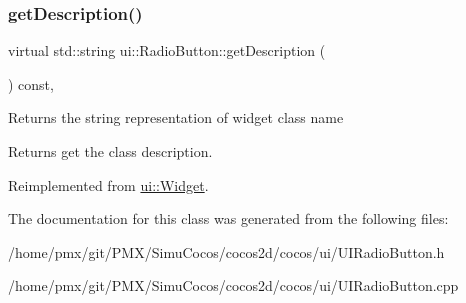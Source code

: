 \subsubsection{\texorpdfstring{get\+Description()}{getDescription()}\hspace{0.1cm}{\footnotesize\ttfamily [2/2]}}
{\footnotesize\ttfamily virtual std\+::string ui\+::\+Radio\+Button\+::get\+Description (\begin{DoxyParamCaption}{ }\end{DoxyParamCaption}) const\hspace{0.3cm}{\ttfamily [override]}, {\ttfamily [virtual]}}

Returns the string representation of widget class name \begin{DoxyReturn}{Returns}
get the class description. 
\end{DoxyReturn}


Reimplemented from \hyperlink{classui_1_1Widget_ad85abdaa9133dc6b8efc32670ae9b93f}{ui\+::\+Widget}.



The documentation for this class was generated from the following files\+:\begin{DoxyCompactItemize}
\item 
/home/pmx/git/\+P\+M\+X/\+Simu\+Cocos/cocos2d/cocos/ui/U\+I\+Radio\+Button.\+h\item 
/home/pmx/git/\+P\+M\+X/\+Simu\+Cocos/cocos2d/cocos/ui/U\+I\+Radio\+Button.\+cpp\end{DoxyCompactItemize}
